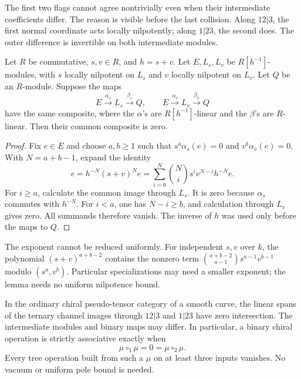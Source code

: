 The first two flags cannot agree nontrivially even when their
intermediate coefficients differ. The reason is visible before
the last collision. Along \(12|3\), the first normal coordinate
acts locally nilpotently; along \(1|23\), the second does. The
outer difference is invertible on both intermediate modules.

\begin{lemma}\label{e1f:lem:separation}
Let \(R\) be commutative, \(s,v\in R\), and \(h=s+v\).
Let \(E,L_s,L_v\) be \(R[h^{-1}]\)-modules, with \(s\)
locally nilpotent on \(L_s\) and \(v\) locally nilpotent on
\(L_v\). Let \(Q\) be an \(R\)-module. Suppose the maps
\[
 E\xrightarrow{\alpha_s}L_s\xrightarrow{\beta_s}Q,
 \qquad
 E\xrightarrow{\alpha_v}L_v\xrightarrow{\beta_v}Q
\]
have the same composite, where the \(\alpha\)'s are
\(R[h^{-1}]\)-linear and the \(\beta\)'s are \(R\)-linear.
Then their common composite is zero.
\end{lemma}

\begin{proof}
Fix \(e\in E\) and choose \(a,b\geq1\) such that
\(s^a\alpha_s(e)=0\) and \(v^b\alpha_v(e)=0\). With
\(N=a+b-1\), expand the identity
\[
 e=h^{-N}(s+v)^Ne
   =\sum_{i=0}^N\binom Ni s^iv^{N-i}h^{-N}e.
\]
For \(i\geq a\), calculate the common image through \(L_s\).
It is zero because \(\alpha_s\) commutes with \(h^{-N}\).
For \(i<a\), one has \(N-i\geq b\), and calculation through
\(L_v\) gives zero. All summands therefore vanish.
The inverse of \(h\) was used only before the maps to \(Q\).
\end{proof}

The exponent cannot be reduced uniformly. For independent
\(s,v\) over \(k\), the polynomial \((s+v)^{a+b-2}\)
contains the nonzero term
\(\binom{a+b-2}{a-1}s^{a-1}v^{b-1}\) modulo
\((s^a,v^b)\). Particular specializations may need a smaller
exponent; the lemma needs no uniform nilpotence bound.

\begin{theorem}\label{e1f:thm:twostep}
In the ordinary chiral pseudo-tensor category of a smooth curve,
the linear spans of the ternary channel images through \(12|3\)
and \(1|23\) have zero intersection. The intermediate modules
and binary maps may differ. In particular, a binary chiral
operation is strictly associative exactly when
\[
 \mu\circ_1\mu=0=\mu\circ_2\mu.
\]
Every tree operation built from such a \(\mu\) on at least
three inputs vanishes. No vacuum or uniform pole bound is needed.
\end{theorem}

